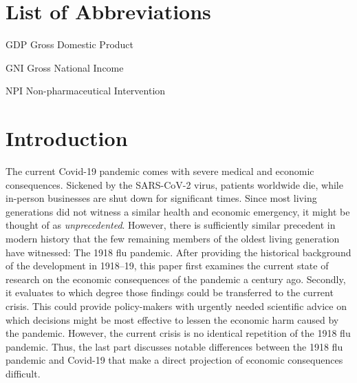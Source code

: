 \documentclass[12pt,a4paper]{article}
\let\oldquote\quote
\let\endoldquote\endquote
\renewenvironment{quote}[2][]
{\if\relax\detokenize{#1}\relax
	\def\quoteauthor{#2}%
	\else
	\def\quoteauthor{#2~---~#1}%
	\fi
	\oldquote}
{\par\nobreak\smallskip\hfill(\quoteauthor)%
	\endoldquote\addvspace{\bigskipamount}}
\begin{document}
\pagebreak
\pagestyle{plain}
\tableofcontents
\pagebreak
\listoffigures
\newpage
{}
 
\section*{List of Abbreviations}
 
\begin{abbrv}
 
\item[GDP]			Gross Domestic Product
\item[GNI]			Gross National Income
\item[NPI]			Non-pharmaceutical Intervention

\end{abbrv}
\newpage
\setcounter{page}{2}
\setlength{\baselineskip}{1.5\baselineskip}
\pagestyle{plain}


\section{Introduction}


The current Covid-19 pandemic comes with severe medical and economic consequences.
Sickened by the SARS-CoV-2 virus, patients worldwide die, while in-person businesses are shut down for significant times.
Since most living generations did not witness a similar health and economic emergency, it might be thought of as \textit{unprecedented}.
However, there is sufficiently similar precedent in modern history that the few remaining members of the oldest living generation have witnessed: The 1918 flu pandemic.
After providing the historical background of the development in 1918--19, this paper first examines the current state of research on the economic consequences of the pandemic a century ago.
Secondly, it evaluates to which degree those findings could be transferred to the current crisis.
This could provide policy-makers with urgently needed scientific advice on which decisions might be most effective to lessen the economic harm caused by the pandemic.
However, the current crisis is no identical repetition of the 1918 flu pandemic.
Thus, the last part discusses notable differences between the 1918 flu pandemic and Covid-19 that make a direct projection of economic consequences difficult.
\end{document}
